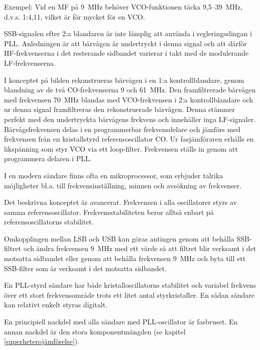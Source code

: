 Exempel: Vid en MF på 9~MHz behöver VCO-funktionen täcka 9,5--39~MHz,
d.v.s. 1:4,11, vilket är för mycket för en VCO.

SSB-signalen efter 2:a blandaren är inte lämplig att använda i
regleringsslingan i PLL. Anledningen är att bärvågen är undertryckt i
denna signal och att därför HF-frekvenserna i det resterande sidbandet
varierar i takt med de modulerande LF-frekvenserna.

I konceptet på bilden rekonstrueras bärvågen i en 1:a kontrollblandare,
genom blandning av de två CO-frekvenserna 9 och 61~MHz.
Den framfiltrerade bärvågen med frekvensen 70~MHz blandas med
VCO-frekvensen i 2:a kontrollblandare och ur denna signal
framfiltreras den rekonstruerade bärvågen. Denna stämmer perfekt med
den undertryckta bärvågens frekvens och innehåller inga
LF-signaler. Bärvågsfrekvensen delas i en programmerbar frekvensdelare
och jämförs med frekvensen från en kristallstyrd referensoscillator
CO. Ur fasjämföraren erhålls en likspänning som styr VCO via ett
loop-filter. Frekvensen ställs in genom att programmera delaren i PLL.

I en modern sändare finns ofta en mikroprocessor, som erbjuder talrika
möjligheter bl.a. till frekvensinställning, minnen och avsökning av
frekvenser.

Det beskrivna konceptet är avancerat.  Frekvensen i alla oscillatorer
styrs av samma referensoscillator. Frekvensstabiliteten beror alltså
enbart på referensoscillatorns stabilitet.

Omkopplingen mellan LSB och USB kan göras antingen genom att behålla
SSB-filtret och ändra frekvensen 9~MHz med ett värde så att filtret
blir verksamt i det motsatta sidbandet eller genom att behålla
frekvensen 9~MHz och byta till ett SSB-filter som är verksamt i det
motsatta sidbandet.

En PLL-styrd sändare har både kristalloscillatorns stabilitet och
variabel frekvens över ett stort frekvensområde trots ett litet antal
styrkristaller. En sådan sändare kan relativt enkelt styras digitalt.

En principiell nackdel med alla sändare med PLL-oscillator är
fasbruset. En annan nackdel är den stora komponentmängden
(se kapitel \ref{superheterojämförelse}).
